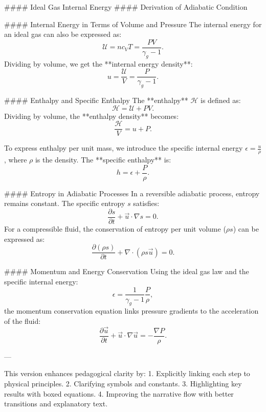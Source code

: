 #### Ideal Gas Internal Energy
#### Derivation of Adiabatic Condition

#### Internal Energy in Terms of Volume and Pressure
The internal energy for an ideal gas can also be expressed as:
\begin{equation}
\mathcal{U} = n c_V T = \frac{P V}{\gamma_g - 1}.
\end{equation}
Dividing by volume, we get the **internal energy density**:
\begin{equation}
u = \frac{\mathcal{U}}{V} = \frac{P}{\gamma_g - 1}.
\end{equation}

#### Enthalpy and Specific Enthalpy
The **enthalpy** \( \mathcal{H} \) is defined as:
\[
\mathcal{H} = \mathcal{U} + P V.
\]
Dividing by volume, the **enthalpy density** becomes:
\[
\frac{\mathcal{H}}{V} = u + P.
\]

To express enthalpy per unit mass, we introduce the specific internal energy \( \epsilon = \frac{u}{\rho} \), where \( \rho \) is the density. The **specific enthalpy** is:
\begin{equation}
h = \epsilon + \frac{P}{\rho}.
\end{equation}

#### Entropy in Adiabatic Processes
In a reversible adiabatic process, entropy remains constant. The specific entropy \( s \) satisfies:
\[
\frac{\partial s}{\partial t} + \vec{u} \cdot \nabla s = 0.
\]
For a compressible fluid, the conservation of entropy per unit volume (\( \rho s \)) can be expressed as:
\begin{equation}
\frac{\partial (\rho s)}{\partial t} + \nabla \cdot (\rho s \vec{u}) = 0.
\end{equation}

#### Momentum and Energy Conservation
Using the ideal gas law and the specific internal energy:
\[
\epsilon = \frac{1}{\gamma_g - 1} \frac{P}{\rho},
\]
the momentum conservation equation links pressure gradients to the acceleration of the fluid:
\begin{equation}
\frac{\partial \vec{u}}{\partial t} + \vec{u} \cdot \nabla \vec{u} = -\frac{\nabla P}{\rho}.
\end{equation}

---

This version enhances pedagogical clarity by:
1. Explicitly linking each step to physical principles.
2. Clarifying symbols and constants.
3. Highlighting key results with boxed equations.
4. Improving the narrative flow with better transitions and explanatory text.


